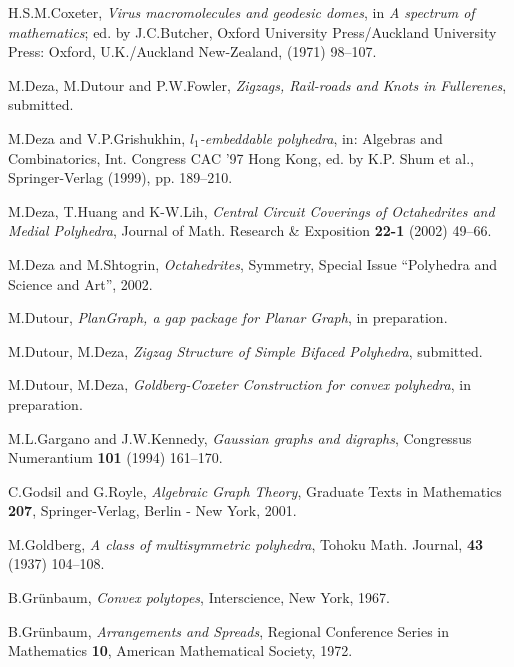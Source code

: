 \documentclass[12pt]{article}
\begin{document}
\begin{thebibliography}{99}



H.S.M.Coxeter, {\em Virus macromolecules and geodesic domes}, in {\em A spectrum of mathematics}; ed. by J.C.Butcher, Oxford University Press/Auckland University Press: Oxford, U.K./Auckland New-Zealand, (1971) 98--107.


M.Deza, M.Dutour and P.W.Fowler,
{\em Zigzags, Rail-roads and Knots in Fullerenes},
submitted.


M.Deza and V.P.Grishukhin,
{\em $l_1$-embeddable polyhedra},
in: Algebras and Combinatorics, Int. Congress CAC '97 Hong Kong,
ed. by K.P. Shum et al., Springer-Verlag (1999), pp. 189--210.


M.Deza, T.Huang and K-W.Lih,
{\em Central Circuit Coverings of Octahedrites and Medial Polyhedra},
Journal of Math. Research \& Exposition {\bf 22-1} (2002) 49--66.


M.Deza and M.Shtogrin,
{\em Octahedrites}, 
Symmetry, Special Issue ``Polyhedra and Science and Art'', 2002.


M.Dutour, {\em PlanGraph, a gap package for Planar Graph}, in preparation.


M.Dutour, M.Deza, {\em Zigzag Structure of Simple Bifaced Polyhedra}, submitted.


M.Dutour, M.Deza, {\em Goldberg-Coxeter Construction for convex polyhedra}, in preparation.


M.L.Gargano and J.W.Kennedy,
{\em Gaussian graphs and digraphs}, Congressus Numerantium {\bf 101}
(1994) 161--170.


C.Godsil and G.Royle, {\em Algebraic Graph Theory}, Graduate Texts in 
Mathematics {\bf 207}, Springer-Verlag, Berlin - New York, 2001.


M.Goldberg, {\em A class of multisymmetric polyhedra}, Tohoku Math.
Journal, {\bf 43} (1937) 104--108.


B.Gr\"{u}nbaum, {\em Convex polytopes}, Interscience, New York, 1967.


B.Gr\"{u}nbaum, {\em Arrangements and Spreads}, Regional Conference Series in
Mathematics {\bf 10}, American Mathematical Society, 1972.



\end{thebibliography}
\end{document}
